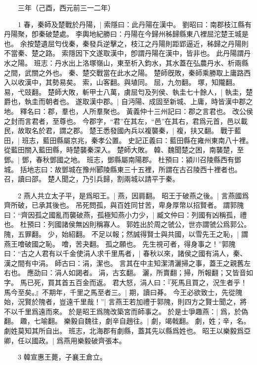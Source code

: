 　　三年（己酉，西元前三一二年）

　　1 春，秦師及楚戰於丹陽，|{
	索隱曰：此丹陽在漢中。
	劉昭曰：南郡枝江縣有丹陽聚，卽秦破楚處。
	李輿地紀勝曰：丹陽在今歸州秭歸縣東八裡屈沱楚王城是也。
	余按楚遺屈匄伐秦，秦發兵逆擊之，枝江之丹陽則距郢逼近，秭歸之丹陽則不當秦、楚之路。
	索隱因下文遂取漢中，卽謂丹陽在漢中，皆非也。
	此丹陽謂丹水之陽。
	班志：丹水出上洛塚嶺山，東至析入鈞水，其水蓋在弘農丹水、析兩縣之間，武關之外也。
	秦、楚交戰當在此水之陽。
	楚師旣敗，秦師乘勝取上庸路西入以收漢中，其勢易矣。
	索，山客翻。與埴同。
	屈，九勿翻。
	塚，知隴翻。
	易，弋豉翻。
}
楚師大敗，斬甲士八萬，虜屈匄及列侯、執圭七十餘人，|{
	執圭，楚爵也，執圭而朝者也。
}
遂取漢中郡。|{
	自沔陽、成固至新城、上庸，時皆漢中郡之地。
	釋名曰：郡，羣也，人所羣聚也。
	黃義仲十三州記曰：郡之言君也。
	改公侯之封而言君者，至尊也。
	今郡字，“君”在其左，“邑”在其右，君爲元首，邑以載民，故取名於君，謂之郡。
}
楚王悉發國內兵以複襲秦，|{
	複，扶又翻。
}
戰于藍田，|{
	班志，藍田縣屬京兆，秦孝公置。
	史記正義曰：藍田縣在雍州東南八十裡。
	從藍田關入藍田縣，時楚襲秦深入。
}
楚師大敗。
	韓、魏聞楚之困，南襲楚，至鄧。|{
	鄧，春秋鄧國之地。
	班志，鄧縣屬南陽郡。
	杜預曰：潁川召陵縣西有鄧城。
	括地志曰：故鄧城在豫州郾陵縣東三十五裡，所謂在古召陵西十裡者也。
	召，讀曰邵。
}
楚人聞之，乃引兵歸，割兩城以請平于秦。


　　2 燕人共立太子平，是爲昭王。|{
	燕，因肩翻。
}
昭王于破燕之後。|{
	言燕國爲齊所破，已承其後也。
}
吊死問孤，與百姓同甘苦，卑身厚幣以招賢者。
	謂郭隗曰：“齊因孤之國亂而襲破燕，孤極知燕小力少，|{
	臧文仲曰：列國有凶稱孤，禮也。
	杜預曰：列國諸侯無凶則稱寡人。
	郭姓出於周之虢公，世亦謂虢公爲郭公。
	隗，五罪翻。
	少，始紹翻。
}
不足以報；然誠得賢士與共國，以雪先王之恥，|{
	謂燕王噲破國之恥。
	噲，苦夬翻。
}
孤之願也。
	先生視可者，得身事之！”郭隗曰：“古之人君有以千金使涓人求千里馬者，|{
	春秋以來，諸侯之國有涓人，秦、漢之間有中涓。
	師古曰：涓，潔也。
	言其在中主知潔清灑掃之事，蓋王之親舊左右也。
	應劭曰：涓人如謁者。
	涓，古玄翻。
	灑，所賣翻；掃，所報翻；又皆音如字。
}
馬已死，買其首五百金而返。
	君大怒，涓人曰：『死馬且買之，況生者乎！馬今至矣。』不期年，千里之馬至者三。|{
	期，讀曰朞。
}
今王必欲致士，先從隗始，況賢於隗者，豈遠千里哉！”|{
	言燕王若加禮于郭隗，則四方之賢士聞之，將不以千里爲遠而來。
}
於是昭王爲隗改築宮而師事之。
	於是士爭趣燕：|{
	爲，於偽翻。
	趣，七喻翻。
}
樂毅自魏往，劇辛自趙往。|{
	劇，竭戟翻。
	劇，姓；辛，名。
	劇姓莫知其所自出。
	班志，北海郡有劇縣，蓋其先以縣爲姓也。
}
昭王以樂毅爲亞卿，任以國政。|{
	爲燕用樂毅破齊張本。
}

　　3 韓宣惠王薨，子襄王倉立。


